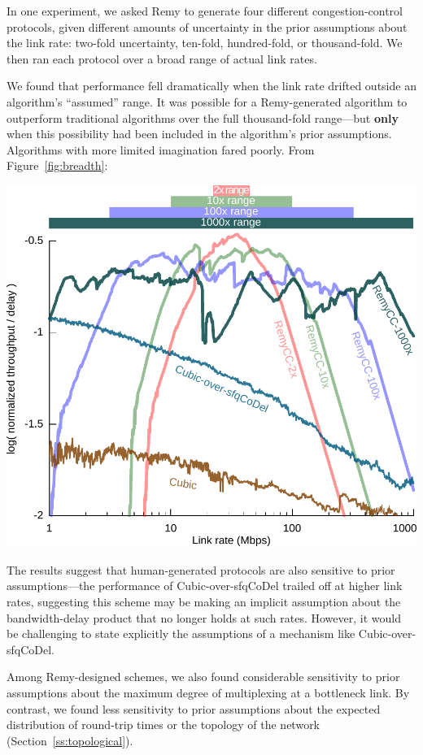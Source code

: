 In one experiment, we asked Remy to generate four different
congestion-control protocols, given different amounts of uncertainty
in the prior assumptions about the link rate: two-fold uncertainty,
ten-fold, hundred-fold, or thousand-fold. We then ran each protocol over a
broad range of actual link rates.

We found that performance fell dramatically when the link rate drifted
outside an algorithm's ``assumed'' range. It was possible for a
Remy-generated algorithm to outperform traditional algorithms over the
full thousand-fold range---but \textbf{only} when this possibility had
been included in the algorithm's prior assumptions. Algorithms with
more limited imagination fared poorly. From Figure~\ref{fig:breadth}:

\begin{center}
\includegraphics[width=0.95 \columnwidth]{oprange-manual.pdf}
\end{center}

The results suggest that human-generated protocols are also sensitive
to prior assumptions---the performance of Cubic-over-sfqCoDel trailed
off at higher link rates, suggesting this scheme may be making an implicit
assumption about the bandwidth-delay product that no longer holds at
such rates. However, it would be challenging to state explicitly the
assumptions of a mechanism like Cubic-over-sfqCoDel.

Among Remy-designed schemes, we also found considerable sensitivity to
prior assumptions about the maximum degree of multiplexing at a
bottleneck link. By contrast, we found less sensitivity to prior
assumptions about the expected distribution of round-trip times or the
topology of the network (Section~\ref{ss:topological}).

